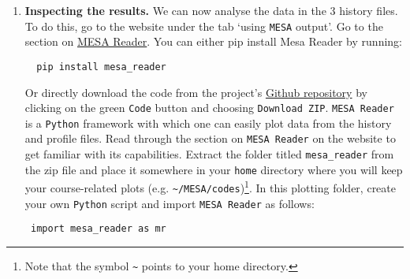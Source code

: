 \documentclass[11pt,a4paper]{article}
\begin{document}
\begin{enumerate}
\begin{enumerate}
    \item After the model finishes, create a new copy of the work folder and rename the \textbf{old} folder to an appropriate name (e.g. identify it by the mass and overshoot value used, like \verb|M3_0ov0| for mass 3 and overshoot 0). 
    In the new work folder, uncomment the lines relating to convective overshooting in your inlist and change the overshooting parameter \verb|overshoot_f(1)| to 0.25. 
    Look for the meaning of this and other overshooting parameters in the file \verb|$MESA_DIR/star/defaults/controls.defaults| or by checking \href{https://docs.mesastar.org/en/latest/reference/controls.html}{the documentation online}.
    \footnote{Note that the documentation online is for the latest version of \texttt{MESA}, which may differ slightly from the version you are using. The bottom right of the documentation page shows which version of the docs you are viewing, but note this only dates back to version r15140, which is when MESA was migrated to GitHub.
    \texttt{\$MESA\_DIR/star/defaults/controls.defaults} will always show the information for the correct version for your installation.}
    Then compile and run the code again.  Repeat this process for an overshooting parameter of 0.5.

\end{enumerate}




\item \textbf{Inspecting the results. }
We can now analyse the data in the 3 history files. To do this, go to the website under the tab `using \texttt{MESA} output'. Go to the section on \href{https://docs.mesastar.org/en/latest/using_mesa/output.html#plotting-mesa-output}{MESA Reader}. 
%
You can either pip install Mesa Reader by running:
  \begin{lstlisting}
  pip install mesa_reader
  \end{lstlisting}
Or directly download the code from the project's \href{https://github.com/wmwolf/py_mesa_reader}{Github repository} by clicking on the green \texttt{Code} button and choosing \texttt{Download ZIP}. 
%
\texttt{MESA Reader} is a \texttt{Python} framework with which one can easily plot data from the history and profile files. Read through the section on \texttt{MESA Reader} on the website to get familiar with its capabilities. 
Extract the folder titled \texttt{mesa\_reader} from the zip file and place it somewhere in your \texttt{home} directory where you will keep your course-related plots (e.g. \verb|~/MESA/codes|)\footnote{Note that the symbol \texttt{\~} points to your home directory.}. 
In this plotting folder, create your own \texttt{Python} script and import \texttt{MESA Reader} as follows:
\begin{lstlisting}
 import mesa_reader as mr
\end{lstlisting}


\end{enumerate}
\end{document}
